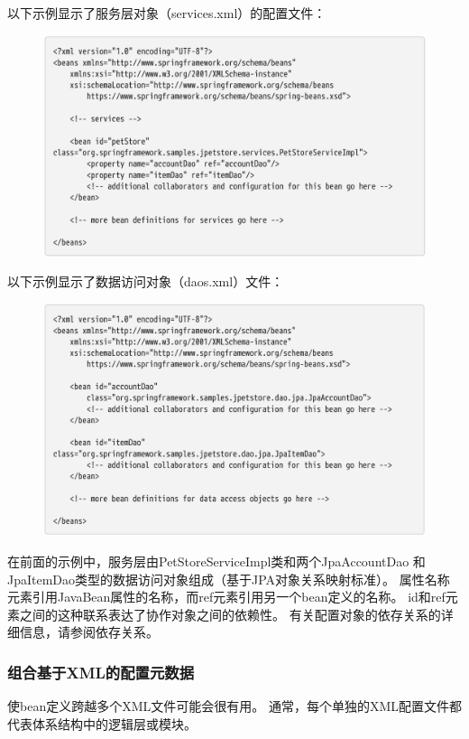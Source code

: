 \newpage
以下示例显示了服务层对象（services.xml）的配置文件：

\begin{figure}[ht]
\centering
\includegraphics[width=1\linewidth]{./Figure/IMG_code_3.png}
\end{figure}

以下示例显示了数据访问对象（daos.xml）文件：

\begin{figure}[ht]
\centering
\includegraphics[width=1\linewidth]{./Figure/IMG_code_4.png}
\end{figure}

在前面的示例中，服务层由PetStoreServiceImpl类和两个JpaAccountDao
和JpaItemDao类型的数据访问对象组成（基于JPA对象关系映射标准）。
 属性名称元素引用JavaBean属性的名称，而ref元素引用另一个bean定义的名称。 
 id和ref元素之间的这种联系表达了协作对象之间的依赖性。 
 有关配置对象的依存关系的详细信息，请参阅依存关系。

 \subsubsection{组合基于XML的配置元数据}
 使bean定义跨越多个XML文件可能会很有用。 
 通常，每个单独的XML配置文件都代表体系结构中的逻辑层或模块。

